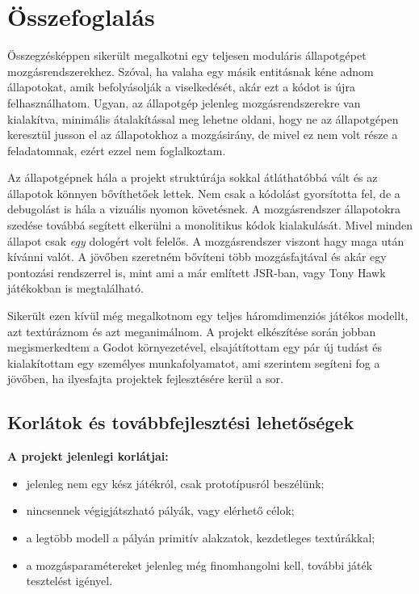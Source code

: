 \chapter{Összefoglalás}

Összegzésképpen sikerült megalkotni egy teljesen moduláris állapotgépet\\
mozgásrendszerekhez. Szóval, ha valaha egy másik entitásnak kéne adnom állapotokat, amik befolyásolják a viselkedését, akár ezt a kódot is újra felhasználhatom. Ugyan, az állapotgép jelenleg mozgásrendszerekre van kialakít\-va, minimális átalakítással meg lehetne oldani, hogy ne az állapotgépen keresztül jusson el az állapotokhoz a mozgásirány, de mivel ez nem volt része a feladatomnak, ezért ezzel nem foglalkoztam.

Az állapotgépnek hála a projekt struktúrája sokkal átláthatóbbá vált és az állapotok könnyen bővíthetőek lettek. Nem csak a kódolást gyorsította fel, de a debugolást is hála a vizuális nyomon követésnek. A mozgásrendszer állapotokra szedése továbbá segített elkerülni a monolitikus kódok kialakulását. Mivel minden állapot csak \textit{egy} dologért volt felelős. A mozgásrendszer viszont hagy maga után kívánni valót. A jövőben szeretném bővíteni több mozgásfajtával és akár egy pontozási rendszerrel is, mint ami a már említett JSR-ban, vagy Tony Hawk játékokban is megtalálható. 

Sikerült ezen kívül még megalkotnom egy teljes háromdimenziós játékos modellt, azt textúráznom és azt meganimálnom. A projekt elkészítése során jobban megismerkedtem a Godot környezetével, elsajátítottam egy pár új tudást és kialakítottam egy személyes munkafolyamatot, ami szerintem segíteni fog a jövőben, ha ilyesfajta projektek fejlesztésére kerül a sor.

\section[Továbbfejlesztés]{Korlátok és továbbfejlesztési lehetőségek}

\textbf{A projekt jelenlegi korlátjai:}
\begin{itemize}
	\item jelenleg nem egy kész játékról, csak prototípusról beszélünk;
	\item nincsennek végigjátszható pályák, vagy elérhető célok;
	\item a legtöbb modell a pályán primitív alakzatok, kezdetleges textúrákkal;
	\item a mozgásparamétereket jelenleg még finomhangolni kell, további játék tesztelést igényel.
\end{itemize}

